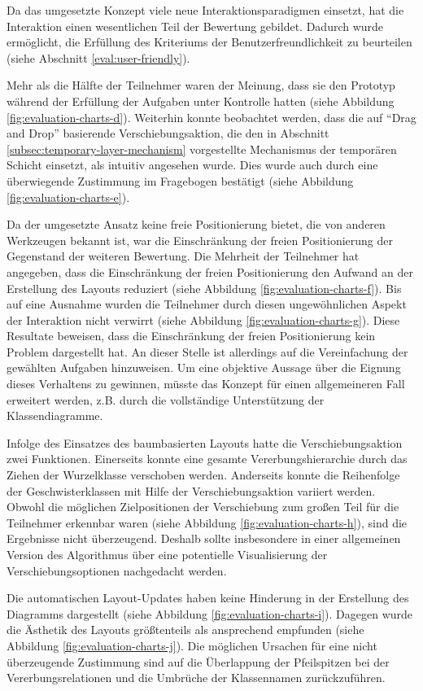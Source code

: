 Da das umgesetzte Konzept viele neue Interaktionsparadigmen einsetzt, hat die Interaktion einen wesentlichen Teil der Bewertung gebildet. Dadurch wurde ermöglicht, die Erfüllung des Kriteriums der Benutzerfreundlichkeit zu beurteilen (siehe Abschnitt \ref{eval:user-friendly}).

Mehr als die Hälfte der Teilnehmer waren der Meinung, dass sie den Prototyp während der Erfüllung der Aufgaben unter Kontrolle hatten (siehe Abbildung \ref{fig:evaluation-charts-d}). Weiterhin konnte beobachtet werden, dass die auf \enquote{Drag and Drop} basierende Verschiebungsaktion, die den in Abschnitt \ref{subsec:temporary-layer-mechanism} vorgestellte Mechanismus der temporären Schicht einsetzt, als intuitiv angesehen wurde. Dies wurde auch durch eine überwiegende Zustimmung im Fragebogen bestätigt (siehe Abbildung \ref{fig:evaluation-charts-e}).

Da der umgesetzte Ansatz keine freie Positionierung bietet, die von anderen Werkzeugen bekannt ist, war die Einschränkung der freien Positionierung der Gegenstand der weiteren Bewertung. Die Mehrheit der Teilnehmer hat angegeben, dass die Einschränkung der freien Positionierung den Aufwand an der Erstellung des Layouts reduziert (siehe Abbildung \ref{fig:evaluation-charts-f}). Bis auf eine Ausnahme wurden die Teilnehmer durch diesen ungewöhnlichen Aspekt der Interaktion nicht verwirrt (siehe Abbildung \ref{fig:evaluation-charts-g}). Diese Resultate beweisen, dass die Einschränkung der freien Positionierung kein Problem dargestellt hat. An dieser Stelle ist allerdings auf die Vereinfachung der gewählten Aufgaben hinzuweisen. Um eine objektive Aussage über die Eignung dieses Verhaltens zu gewinnen, müsste das Konzept für einen allgemeineren Fall erweitert werden, z.B. durch die vollständige Unterstützung der Klassendiagramme.

Infolge des Einsatzes des baumbasierten Layouts hatte die Verschiebungsaktion zwei Funktionen. Einerseits konnte eine gesamte Vererbungshierarchie durch das Ziehen der Wurzelklasse verschoben werden. Anderseits konnte die Reihenfolge der Geschwisterklassen mit Hilfe der Verschiebungsaktion variiert werden. Obwohl die möglichen Zielpositionen der Verschiebung zum großen Teil für die Teilnehmer erkennbar waren (siehe Abbildung \ref{fig:evaluation-charts-h}), sind die Ergebnisse nicht überzeugend. Deshalb sollte insbesondere in einer allgemeinen Version des Algorithmus über eine potentielle Visualisierung der Verschiebungsoptionen nachgedacht werden.

Die automatischen Layout-Updates haben keine Hinderung in der Erstellung des Diagramms dargestellt (siehe Abbildung \ref{fig:evaluation-charts-i}). Dagegen wurde die Ästhetik des Layouts größtenteils als ansprechend empfunden (siehe Abbildung \ref{fig:evaluation-charts-j}). Die möglichen Ursachen für eine nicht überzeugende Zustimmung sind auf die Überlappung der Pfeilspitzen bei der Vererbungsrelationen und die Umbrüche der Klassennamen zurückzuführen.

